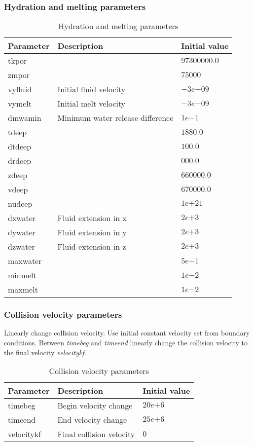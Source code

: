 \subsubsection{Hydration and melting parameters}

\begin{table}[H]
\small
\centering
\begin{tabular}{l p{7cm} l}
\toprule
Parameter & Description & Initial value \\
\midrule
tkpor 		& \todo{???} & $97300000.0$\\
zmpor 		& \todo{???} & $75000$\\
vyfluid 	& Initial fluid velocity & $-3e{-09}$\\
vymelt 		& Initial melt velocity & $-3e{-09}$\\
dmwamin 	& Minimum water release difference & $1e{-1}$\\
tdeep 		& \todo{???} & $1880.0$\\
dtdeep 		& \todo{???} & $100.0$\\
drdeep 		& \todo{???} & $000.0$\\
zdeep 		& \todo{???} & $660000.0$\\
vdeep		& \todo{???} & $670000.0$\\
nudeep		& \todo{???} & $1e{+21}$\\
dxwater		& Fluid extension in x & $2e{+3}$\\
dywater		& Fluid extension in y & $2e{+3}$\\
dzwater		& Fluid extension in z & $2e{+3}$\\
maxwater	& \todo{???} & $5e{-1}$\\
minmelt		& \todo{???} & $1e{-2}$\\
maxmelt		& \todo{???} & $1e{-2}$\\
\bottomrule
\end{tabular}
\caption{Hydration and melting parameters}
\label{tbl:mode_melting_parameters}
\end{table}

\subsubsection{Collision velocity parameters}

Linearly change collision velocity. Use initial constant velocity set from boundary conditions. Between \emph{timebeg} and \emph{timeend} linearly change the collision velocity to the final velocity \emph{velocitykf}.

\begin{table}[H]
\small
\centering
\begin{tabular}{l l l}
\toprule
Parameter & Description & Initial value \\
\midrule
timebeg 	& Begin velocity change & $20e{+6}$\\
timeend 	& End velocity change & $25e{+6}$\\
velocitykf 	& Final collision velocity & $0$\\
\bottomrule
\end{tabular}
\caption{Collision velocity parameters}
\label{tbl:mode_collision_parameters}
\end{table}
